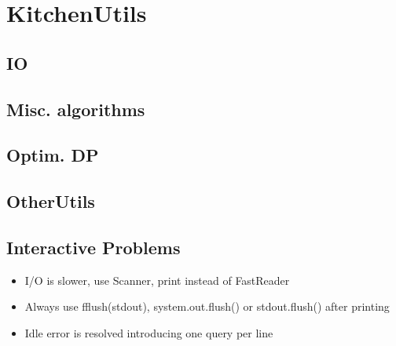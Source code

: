 \chapter{KitchenUtils}

\section{IO}

\section{Misc. algorithms}

 \section{Optim. DP}

  \section{OtherUtils}

  \section{Interactive Problems}
		\begin{itemize}
			\item I/O is slower, use Scanner, print instead of FastReader
			\item Always use fflush(stdout), system.out.flush() or stdout.flush() after printing
			\item Idle error is resolved introducing one query per line
		\end{itemize}
